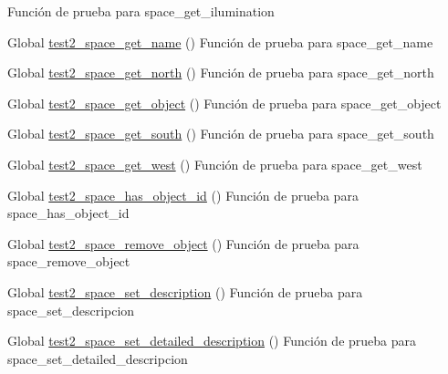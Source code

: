 \begin{DoxyRefList}
%
Función de prueba para space\+\_\+get\+\_\+ilumination  
\item[Global \mbox{\hyperlink{space__test_8c_aee88ed31c63efc674051a4563aed86e2}{test2\+\_\+space\+\_\+get\+\_\+name}} ()]\label{test__test000262}%
%
Función de prueba para space\+\_\+get\+\_\+name  
\item[Global \mbox{\hyperlink{space__test_8c_a61891c9cebb9d26dc9f149ad8341517c}{test2\+\_\+space\+\_\+get\+\_\+north}} ()]\label{test__test000264}%
%
Función de prueba para space\+\_\+get\+\_\+north  
\item[Global \mbox{\hyperlink{space__test_8c_a0fe857c34f691aaba197d03315c3955f}{test2\+\_\+space\+\_\+get\+\_\+object}} ()]\label{test__test000272}%
%
Función de prueba para space\+\_\+get\+\_\+object  
\item[Global \mbox{\hyperlink{space__test_8c_a40fe07c07c1069023b362a9e506c4c59}{test2\+\_\+space\+\_\+get\+\_\+south}} ()]\label{test__test000266}%
%
Función de prueba para space\+\_\+get\+\_\+south  
\item[Global \mbox{\hyperlink{space__test_8c_af1cf02b01c007aec0684186b39666c32}{test2\+\_\+space\+\_\+get\+\_\+west}} ()]\label{test__test000270}%
%
Función de prueba para space\+\_\+get\+\_\+west  
\item[Global \mbox{\hyperlink{space__test_8c_adbd4d71faf31be7d4843821ad44ed099}{test2\+\_\+space\+\_\+has\+\_\+object\+\_\+id}} ()]\label{test__test000276}%
%
Función de prueba para space\+\_\+has\+\_\+object\+\_\+id  
\item[Global \mbox{\hyperlink{space__test_8c_a8f53f80be6eeff3b6e2fd0ce6b6ea310}{test2\+\_\+space\+\_\+remove\+\_\+object}} ()]\label{test__test000274}%
%
Función de prueba para space\+\_\+remove\+\_\+object  
\item[Global \mbox{\hyperlink{space__test_8c_ab3dd07cbead60f87866e2bd2c426da0f}{test2\+\_\+space\+\_\+set\+\_\+description}} ()]\label{test__test000283}%
%
Función de prueba para space\+\_\+set\+\_\+descripcion  
\item[Global \mbox{\hyperlink{space__test_8c_a4a5d16476783f31bda040a95fe0cf825}{test2\+\_\+space\+\_\+set\+\_\+detailed\+\_\+description}} ()]\label{test__test000293}%
%
Función de prueba para space\+\_\+set\+\_\+detailed\+\_\+descripcion  

\end{DoxyRefList}
